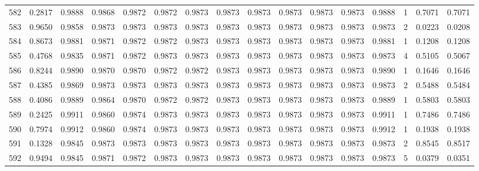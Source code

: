 \begin{tabular}{lrrrrrrrrrrrrrrr}
582 &      0.2817 &  0.9888 &  0.9868 &  0.9872 &  0.9872 &  0.9873 &  0.9873 &  0.9873 &  0.9873 &  0.9873 &   0.9873 &     0.9888 &      1 &                    0.7071 &                     0.7071 \\
583 &      0.9650 &  0.9858 &  0.9873 &  0.9873 &  0.9873 &  0.9873 &  0.9873 &  0.9873 &  0.9873 &  0.9873 &   0.9873 &     0.9873 &      2 &                    0.0223 &                     0.0208 \\
584 &      0.8673 &  0.9881 &  0.9871 &  0.9872 &  0.9872 &  0.9873 &  0.9873 &  0.9873 &  0.9873 &  0.9873 &   0.9873 &     0.9881 &      1 &                    0.1208 &                     0.1208 \\
585 &      0.4768 &  0.9835 &  0.9871 &  0.9872 &  0.9873 &  0.9873 &  0.9873 &  0.9873 &  0.9873 &  0.9873 &   0.9873 &     0.9873 &      4 &                    0.5105 &                     0.5067 \\
586 &      0.8244 &  0.9890 &  0.9870 &  0.9870 &  0.9872 &  0.9872 &  0.9873 &  0.9873 &  0.9873 &  0.9873 &   0.9873 &     0.9890 &      1 &                    0.1646 &                     0.1646 \\
587 &      0.4385 &  0.9869 &  0.9873 &  0.9873 &  0.9873 &  0.9873 &  0.9873 &  0.9873 &  0.9873 &  0.9873 &   0.9873 &     0.9873 &      2 &                    0.5488 &                     0.5484 \\
588 &      0.4086 &  0.9889 &  0.9864 &  0.9870 &  0.9872 &  0.9872 &  0.9873 &  0.9873 &  0.9873 &  0.9873 &   0.9873 &     0.9889 &      1 &                    0.5803 &                     0.5803 \\
589 &      0.2425 &  0.9911 &  0.9860 &  0.9874 &  0.9873 &  0.9873 &  0.9873 &  0.9873 &  0.9873 &  0.9873 &   0.9873 &     0.9911 &      1 &                    0.7486 &                     0.7486 \\
590 &      0.7974 &  0.9912 &  0.9860 &  0.9874 &  0.9873 &  0.9873 &  0.9873 &  0.9873 &  0.9873 &  0.9873 &   0.9873 &     0.9912 &      1 &                    0.1938 &                     0.1938 \\
591 &      0.1328 &  0.9845 &  0.9873 &  0.9873 &  0.9873 &  0.9873 &  0.9873 &  0.9873 &  0.9873 &  0.9873 &   0.9873 &     0.9873 &      2 &                    0.8545 &                     0.8517 \\
592 &      0.9494 &  0.9845 &  0.9871 &  0.9872 &  0.9873 &  0.9873 &  0.9873 &  0.9873 &  0.9873 &  0.9873 &   0.9873 &     0.9873 &      5 &                    0.0379 &                     0.0351 \\

\end{tabular}
